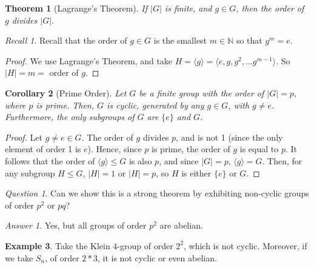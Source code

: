 \documentclass[12pt]{article}
\newtheorem{thm}{Theorem}[section]
\newtheorem{cor}[thm]{Corollary}
\theoremstyle{definition}
\newtheorem{eg}[thm]{Example}
\theoremstyle{remark}
\newtheorem*{qst}{Question}
\newtheorem*{ans}{Answer}
\newtheorem*{rec}{Recall}
\numberwithin{equation}{section}
\newcommand\N{\mathbb N}    %
\begin{document}
\vspace{15pt}

\begin{thm}[Lagrange's Theorem]
        If $|G|$ is finite, and $g \in G$, then the order of $g$ divides $|G|$.
\end{thm}

\begin{rec}
        Recall that the order of $g\in G$ is the smallest $m \in \N$ so that $g^m = e$.
\end{rec}

\begin{proof}
        We use Lagrange's Theorem, and take $H = \langle g \rangle = \langle e,g,g^2,...g^{m-1} \rangle$. So $|H| = m = $ order of $g$.
\end{proof}

\vspace{15pt}

\begin{cor}[Prime Order]
        Let $G$ be a finite group with the order of $|G| = p$, where $p$ is prime. Then, $G$ is cyclic, generated by any $g \in G$, with $g \neq e$. Furthermore, the only subgroups of $G$ are $\{e\}$ and $G$.
\end{cor}
\begin{proof}
        Let $g \neq e \in G$. The order of $g$ divides $p$, and is not 1 (since the only element of order 1 is $e$). Hence, since $p$ is prime, the order of $g$ is equal to $p$. It follows that the order of $\langle g \rangle \leq G$ is also $p$, and since $|G| = p$, $\langle g \rangle = G$. Then, for any subgroup $H \leq G$, $|H| = 1$ or $|H| = p$, so $H$ is either $\{e\}$ or $G$.
\end{proof}

\vspace{15pt}
\begin{qst}
        Can we show this is a strong theorem by exhibiting non-cyclic groups of order $p^2$ or $pq$? 
\end{qst}
\begin{ans}
        Yes, but all groups of order $p^2$ are abelian.
\end{ans}

\begin{eg}
        Take the Klein 4-group of order $2^2$, which is not cyclic. Moreover, if we take $S_n$, of order $2*3$, it is not cyclic or even abelian.
\end{eg}


\vspace{15pt}
\end{document}
